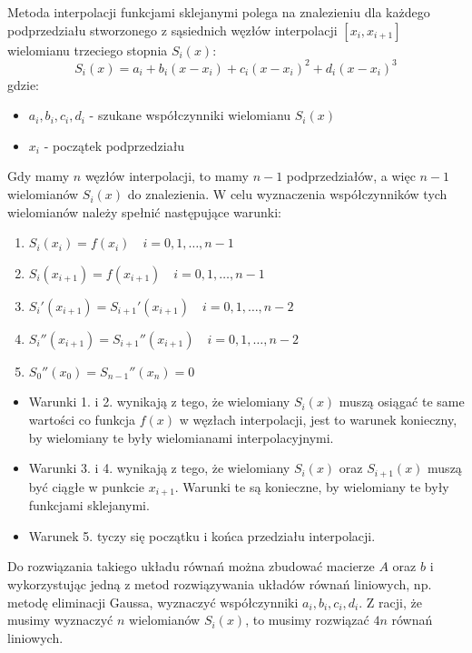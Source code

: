 \documentclass{article}
\begin{document}
Metoda interpolacji funkcjami sklejanymi polega na znalezieniu dla każdego
podprzedziału stworzonego z sąsiednich węzłów
interpolacji $[x_i, x_{i+1}]$ wielomianu trzeciego stopnia $S_i(x)$:
\begin{equation}
    S_i(x) = a_i + b_i(x - x_i) + c_i(x - x_i)^2 + d_i(x - x_i)^3
\end{equation}
gdzie:
\begin{itemize}
    \item $a_i, b_i, c_i, d_i$ - szukane współczynniki wielomianu $S_i(x)$
    \item $x_i$ - początek podprzedziału
\end{itemize}

Gdy mamy $n$ węzłów interpolacji, to mamy $n-1$ podprzedziałów, a więc $n-1$ wielomianów $S_i(x)$
do znalezienia. W celu wyznaczenia współczynników tych wielomianów należy spełnić następujące warunki:
\begin{enumerate}
    \item $S_i(x_i) = f(x_i) \quad  i = 0, 1, \dots, n-1$
    \item $S_i(x_{i+1}) = f(x_{i+1}) \quad  i = 0, 1, \dots, n-1$
    \item $S_i'(x_{i+1}) = S_{i+1}'(x_{i+1}) \quad  i = 0, 1, \dots, n-2$
    \item $S_i''(x_{i+1}) = S_{i+1}''(x_{i+1}) \quad  i = 0, 1, \dots, n-2$
    \item $S_0''(x_0) = S_{n-1}''(x_n) = 0$
\end{enumerate}

\begin{itemize}
    \item Warunki 1. i 2. wynikają z tego, że wielomiany $S_i(x)$ muszą osiągać te same wartości co funkcja $f(x)$ 
    w węzłach interpolacji, jest to warunek konieczny, 
    by wielomiany te były wielomianami interpolacyjnymi.
    \item Warunki 3. i 4. wynikają z tego, że wielomiany $S_i(x)$ oraz $S_{i+1}(x)$ muszą być ciągłe 
    w punkcie $x_{i+1}$. Warunki te są konieczne, by wielomiany te były funkcjami sklejanymi.
    \item Warunek 5. tyczy się początku i końca przedziału interpolacji.

\end{itemize}


Do rozwiązania takiego układu równań można zbudować macierze $A$ oraz $b$ i wykorzystując
jedną z metod rozwiązywania układów równań liniowych, np. metodę eliminacji Gaussa, wyznaczyć
współczynniki $a_i, b_i, c_i, d_i$. Z racji, że musimy wyznaczyć $n$ wielomianów $S_i(x)$,
to musimy rozwiązać $4n$ równań liniowych.
\end{document}
